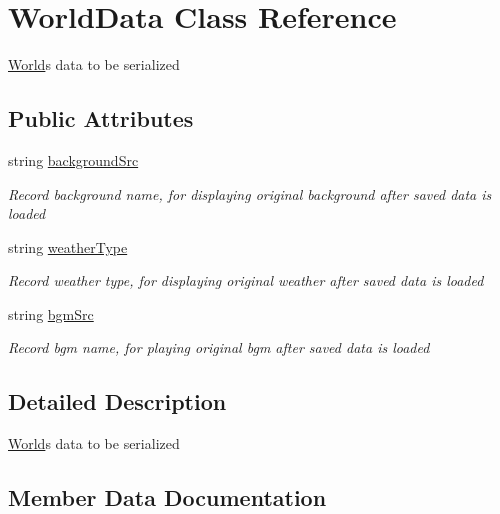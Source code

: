 \hypertarget{class_world_data}{}\section{World\+Data Class Reference}
\label{class_world_data}


\hyperlink{class_world}{World}\textquotesingle{}s data to be serialized  


\subsection*{Public Attributes}
\begin{DoxyCompactItemize}
\item 
string \hyperlink{class_world_data_ac9d2cd2f96b4eba97c7998cf62d7a1ac}{background\+Src}
\begin{DoxyCompactList}\small\item\em Record background name, for displaying original background after saved data is loaded \end{DoxyCompactList}\item 
string \hyperlink{class_world_data_a5cdbd4ffc9bddc4978309c0e12eed7af}{weather\+Type}
\begin{DoxyCompactList}\small\item\em Record weather type, for displaying original weather after saved data is loaded \end{DoxyCompactList}\item 
string \hyperlink{class_world_data_a6ec40e24b37d400f3946ed7a8c21ebbf}{bgm\+Src}
\begin{DoxyCompactList}\small\item\em Record bgm name, for playing original bgm after saved data is loaded \end{DoxyCompactList}\end{DoxyCompactItemize}


\subsection{Detailed Description}
\hyperlink{class_world}{World}\textquotesingle{}s data to be serialized 



\subsection{Member Data Documentation}

